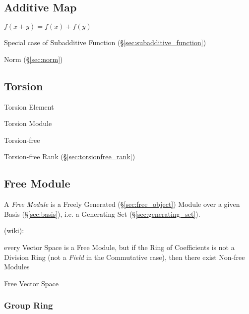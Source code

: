 \subsection{Additive Map}\label{sec:additive_map}

$f(x + y) = f(x) + f(y)$

Special case of Subadditive Function (\S\ref{sec:subadditive_function})

Norm (\S\ref{sec:norm})



\subsection{Torsion}\label{sec:torsion}

Torsion Element

Torsion Module

Torsion-free

Torsion-free Rank (\S\ref{sec:torsionfree_rank})



\subsection{Free Module}\label{sec:free_module}

A \emph{Free Module} is a Freely Generated (\S\ref{sec:free_object}) Module
over a given Basis (\S\ref{sec:basis}), i.e. a Generating Set
(\S\ref{sec:generating_set}).

(wiki):

every Vector Space is a Free Module, but if the Ring of Coefficients is not a
Division Ring (not a \emph{Field} in the Commutative case), then there exist
Non-free Modules

Free Vector Space



\subsubsection{Group Ring}\label{sec:group_ring}

